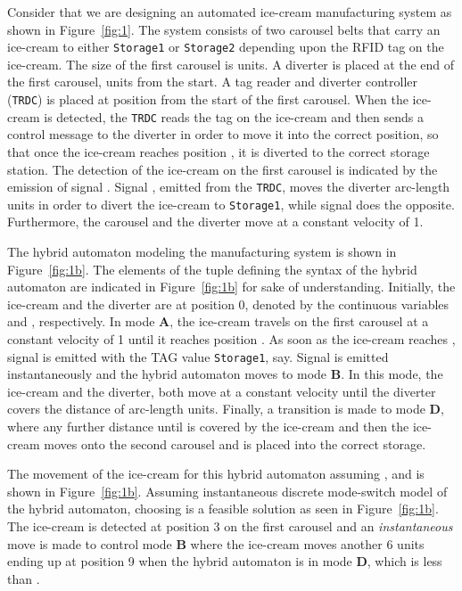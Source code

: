 \documentclass[10pt,journal,cspaper,compsoc]{IEEEtran}
\begin{document}
Consider that we are designing an automated ice-cream manufacturing
system as shown in Figure~\ref{fig:1}. The system consists of two
carousel belts that carry an ice-cream to either \texttt{Storage1} or
\texttt{Storage2} depending upon the RFID tag on the ice-cream. The size
of the first carousel is  units. A diverter is
placed at the end of the first carousel,  units from the start. A
tag reader and diverter controller (\texttt{TRDC}) is placed at position
 from the start of the first carousel. When the ice-cream is
detected, the \texttt{TRDC} reads the tag on the ice-cream and then
sends a control message to the diverter in order to move it into the
correct position, so that once the ice-cream reaches position ,
it is diverted to the correct storage station. The detection of the
ice-cream on the first carousel is indicated by the emission of signal
. Signal , emitted from the \texttt{TRDC}, moves the diverter
 arc-length units in order to divert the ice-cream to
\texttt{Storage1}, while signal  does the opposite. Furthermore, the
carousel and the diverter move at a constant velocity of 1.

The hybrid automaton modeling the manufacturing system is shown in
Figure~\ref{fig:1b}. The elements of the tuple defining the syntax of
the hybrid automaton are indicated in Figure~\ref{fig:1b} for sake of
understanding. Initially, the ice-cream and the diverter are at position
0, denoted by the continuous variables  and , respectively. In
mode \textbf{A}, the ice-cream travels on the first carousel at a
constant velocity of 1 until it reaches position . As soon as
the ice-cream reaches , signal  is emitted with the TAG
value \texttt{Storage1}, say. Signal  is emitted instantaneously and
the hybrid automaton moves to mode \textbf{B}. In this mode, the
ice-cream and the diverter, both move at a constant velocity until the
diverter covers the distance of  arc-length units. Finally, a
transition is made to mode \textbf{D}, where any further distance until
 is covered by the ice-cream and then the ice-cream moves onto
the second carousel and is placed into the correct storage.

The movement of the ice-cream for this hybrid automaton assuming
,  and  is shown in
Figure~\ref{fig:1b}. Assuming instantaneous discrete mode-switch model
of the hybrid automaton, choosing  is a feasible solution as
seen in Figure~\ref{fig:1b}. The ice-cream is detected at position 3 on
the first carousel and an \textit{instantaneous} move is made to control
mode \textbf{B} where the ice-cream moves another 6 units ending up at
position 9 when the hybrid automaton is in mode \textbf{D}, which is
less than .
\end{document}
